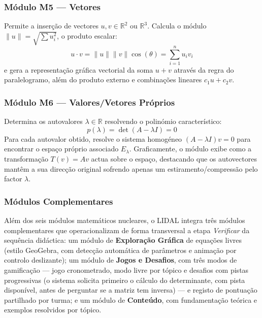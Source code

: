 \documentclass[conference]{IEEEtran}
\begin{document}
\subsubsection{Módulo M5 --- Vetores}
Permite a inserção de vectores $u, v \in \mathbb{R}^2$ ou $\mathbb{R}^3$. Calcula o módulo $\|u\| = \sqrt{\sum u_i^2}$, o produto escalar:
\begin{equation}
u \cdot v = \|u\|\|v\|\cos(\theta) = \sum_{i=1}^{n} u_i v_i
\label{eq:escalar}
\end{equation}
e gera a representação gráfica vectorial da soma $u+v$ através da regra do paralelogramo, além do produto externo e combinações lineares $c_1 u + c_2 v$.

\subsubsection{Módulo M6 --- Valores/Vetores Próprios}
Determina os autovalores $\lambda \in \mathbb{R}$ resolvendo o polinómio característico:
\begin{equation}
p(\lambda) = \det(A - \lambda I) = 0
\label{eq:caracteristico}
\end{equation}
Para cada autovalor obtido, resolve o sistema homogéneo $(A-\lambda I)v = 0$ para encontrar o espaço próprio associado $E_\lambda$. Graficamente, o módulo exibe como a transformação $T(v) = Av$ actua sobre o espaço, destacando que os autovectores mantêm a sua direcção original sofrendo apenas um estiramento/compressão pelo factor $\lambda$.

\subsubsection{Módulos Complementares}
\label{sec:modulos-complementares}
Além dos seis módulos matemáticos nucleares, o LIDAL integra três módulos complementares que operacionalizam de forma transversal a etapa \textit{Verificar} da sequência didáctica: um módulo de \textbf{Exploração Gráfica} de equações livres (estilo GeoGebra, com detecção automática de parâmetros e animação por controlo deslizante); um módulo de \textbf{Jogos e Desafios}, com três modos de gamificação --- jogo cronometrado, modo livre por tópico e desafios com pistas progressivas (o sistema solicita primeiro o cálculo do determinante, com pista disponível, antes de perguntar se a matriz tem inversa) --- e registo de pontuação partilhado por turma; e um módulo de \textbf{Conteúdo}, com fundamentação teórica e exemplos resolvidos por tópico.
\end{document}
